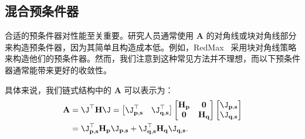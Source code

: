 \subsection{混合预条件器}

合适的预条件器对性能至关重要。研究人员通常使用 $\mathbf{A}$ 的对角线或块对角线部分来构造预条件器，因为其简单且构造成本低。例如，RedMax~\cite{wang_redmax_2019} 采用块对角线策略来构造他们的预条件器。然而，我们注意到这种常见方法并不理想，而以下预条件器通常能带来更好的收敛性。

具体来说，我们链式结构中的 $\mathbf{A}$ 可以表示为：
\begin{equation}
  \begin{aligned}
    \mathbf{A} & = \J^{\top} \mathbf{H} \J =
    \begin{bmatrix}
      \J_{\mathbf{p, s}}^{\top} &
      \J_{\mathbf{q, s}}^{\top}
    \end{bmatrix}
    \begin{bmatrix}
      \mathbf{H}_{\mathbf{p}} & \mathbf{0}              \\
      \mathbf{0}              & \mathbf{H}_{\mathbf{q}}
    \end{bmatrix}
    \begin{bmatrix}
      \J_{\mathbf{p, s}} \\
      \J_{\mathbf{q, s}}
    \end{bmatrix}                                                          \\
               & =\J^{\top}_{\mathbf{p, s}} \mathbf{H}_{\mathbf{p}} \J_{\mathbf{p, s}} +
    \J^{\top}_{\mathbf{q, s}} \mathbf{H}_{\mathbf{q}} \J_{\mathbf{q, s}}.
  \end{aligned}
  \label{eq:A}
\end{equation}

